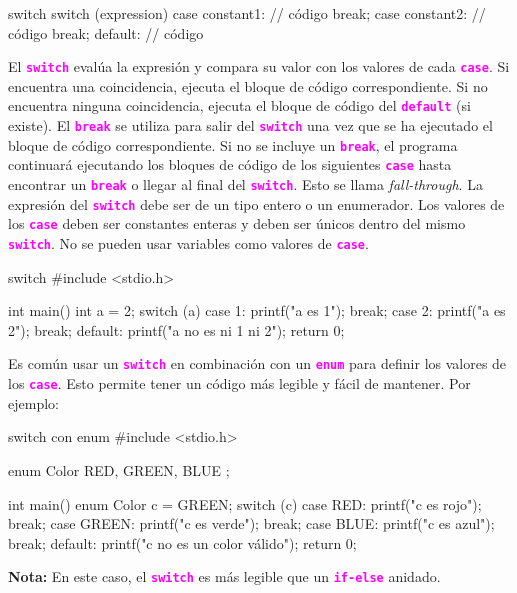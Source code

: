 \documentclass[]{scrartcl}
\newcommand{\hl}[1]{\textcolor{magenta}{\textbf{\texttt{#1}}}}
\begin{document}
\begin{cbox}[]{switch}
  switch (expression) {
    case constant1:
      // código
      break;
    case constant2:
      // código
      break;
    default:
      // código
  }
\end{cbox}

El \hl{switch} evalúa la expresión y compara su valor con los valores de cada \hl{case}. Si encuentra una coincidencia, ejecuta el bloque de código correspondiente. Si no encuentra ninguna coincidencia, ejecuta el bloque de código del \hl{default} (si existe).
El \hl{break} se utiliza para salir del \hl{switch} una vez que se ha ejecutado el bloque de código correspondiente. Si no se incluye un \hl{break}, el programa continuará ejecutando los bloques de código de los siguientes \hl{case} hasta encontrar un \hl{break} o llegar al final del \hl{switch}. Esto se llama \textit{fall-through}.
La expresión del \hl{switch} debe ser de un tipo entero o un enumerador. Los valores de los \hl{case} deben ser constantes enteras y deben ser únicos dentro del mismo \hl{switch}. No se pueden usar variables como valores de \hl{case}.

\begin{cbox}[]{switch}
  #include <stdio.h>
  
  int main() {
    int a = 2;
    switch (a) {
      case 1:
        printf("a es 1\n");
        break;
      case 2:
        printf("a es 2\n");
        break;
      default:
        printf("a no es ni 1 ni 2\n");
    }
    return 0;
  }
\end{cbox}

Es común usar un \hl{switch} en combinación con un \hl{enum} para definir los valores de los \hl{case}. Esto permite tener un código más legible y fácil de mantener. Por ejemplo:
\begin{cbox}[]{switch con enum}
  #include <stdio.h>
  
  enum Color { RED, GREEN, BLUE };
  
  int main() {
    enum Color c = GREEN;
    switch (c) {
      case RED:
        printf("c es rojo\n");
        break;
      case GREEN:
        printf("c es verde\n");
        break;
      case BLUE:
        printf("c es azul\n");
        break;
      default:
        printf("c no es un color válido\n");
    }
    return 0;
  }
\end{cbox}
\begin{notebox}
  \textbf{Nota:} En este caso, el \hl{switch} es más legible que un \hl{if-else} anidado.
\end{notebox}
\end{document}
